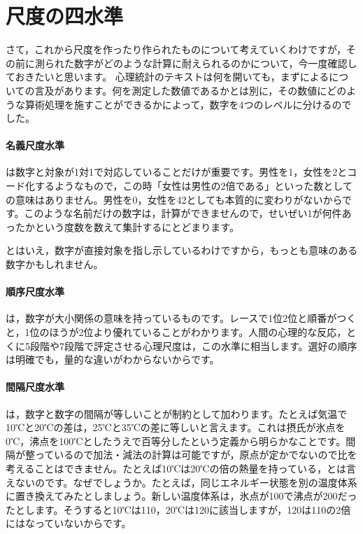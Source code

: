 \documentclass{ltjsbook}
\begin{document}
\section{尺度の四水準}
さて，これから尺度を作ったり作られたものについて考えていくわけですが，その前に測られた数字がどのような計算に耐えられるのかについて，今一度確認しておきたいと思います。
心理統計のテキストは何を開いても，まず\textcite{stevens1946}によるについての言及があります。何を測定した数値であるかとは別に，その数値にどのような算術処理を施すことができるかによって，数字を4つのレベルに分けるのでした。

\paragraph{名義尺度水準} は数字と対象が1対1で対応していることだけが重要です。男性を1，女性を2とコード化するようなもので，この時「女性は男性の2倍である」といった数としての意味はありません。男性を0，女性を42としても本質的に変わりがないからです。このような名前だけの数字は，計算ができませんので，せいぜい1が何件あったかという度数を数えて集計するにとどまります。

とはいえ，数字が直接対象を指し示しているわけですから，もっとも意味のある数字かもしれません。

\paragraph{順序尺度水準} は，数字が大小関係の意味を持っているものです。レースで1位2位と順番がつくと，1位のほうが2位より優れていることがわかります。人間の心理的な反応，とくに5段階や7段階で評定させる心理尺度は，この水準に相当します。選好の順序は明確でも，量的な違いがわからないからです。

\paragraph{間隔尺度水準} は，数字と数字の間隔が等しいことが制約として加わります。たとえば気温で10℃と20℃の差は，25℃と35℃の差に等しいと言えます。これは摂氏が氷点を0℃，沸点を100℃としたうえで百等分したという定義から明らかなことです。間隔が整っているので加法・減法の計算は可能ですが，原点が定かでないので比を考えることはできません。たとえば10℃は20℃の倍の熱量を持っている，とは言えないのです。なぜでしょうか。たとえば，同じエネルギー状態を別の温度体系に置き換えてみたとしましょう。新しい温度体系は，氷点が100で沸点が200だったとします。そうすると10℃は110，20℃は120に該当しますが，120は110の2倍にはなっていないからです。
\end{document}
